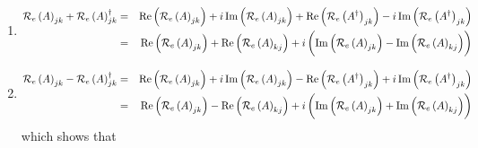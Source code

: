 \begin{remark}
\begin{enumerate}
\begin{enumerate}
\item 
\begin{eqnarray}
{\cal R}_{e}\left( A\right) _{jk}+{\cal R}_{e}\left( A\right) _{jk}^{\dagger
} &=&%
\mathop{\rm Re}%
\left( {\cal R}_{e}\left( A\right) _{jk}\right) +i%
\mathop{\rm Im}%
\left( {\cal R}_{e}\left( A\right) _{jk}\right) +%
\mathop{\rm Re}%
\left( {\cal R}_{e}\left( A^{\dagger }\right) _{jk}\right) -i%
\mathop{\rm Im}%
\left( {\cal R}_{e}\left( A^{\dagger }\right) _{jk}\right) \\
&=&%
\mathop{\rm Re}%
\left( {\cal R}_{e}\left( A\right) _{jk}\right) +%
\mathop{\rm Re}%
\left( {\cal R}_{e}\left( A\right) _{kj}\right) +i\left( \stackrel{}{%
\mathop{\rm Im}%
\left( {\cal R}_{e}\left( A\right) _{jk}\right) -%
\mathop{\rm Im}%
\left( {\cal R}_{e}\left( A\right) _{kj}\right) }\right)
\end{eqnarray}

\item 
\begin{eqnarray}
{\cal R}_{e}\left( A\right) _{jk}-{\cal R}_{e}\left( A\right) _{jk}^{\dagger
} &=&%
\mathop{\rm Re}%
\left( {\cal R}_{e}\left( A\right) _{jk}\right) +i%
\mathop{\rm Im}%
\left( {\cal R}_{e}\left( A\right) _{jk}\right) -%
\mathop{\rm Re}%
\left( {\cal R}_{e}\left( A^{\dagger }\right) _{jk}\right) +i%
\mathop{\rm Im}%
\left( {\cal R}_{e}\left( A^{\dagger }\right) _{jk}\right) \\
&=&%
\mathop{\rm Re}%
\left( {\cal R}_{e}\left( A\right) _{jk}\right) -%
\mathop{\rm Re}%
\left( {\cal R}_{e}\left( A\right) _{kj}\right) +i\left( \stackrel{}{%
\mathop{\rm Im}%
\left( {\cal R}_{e}\left( A\right) _{jk}\right) +%
\mathop{\rm Im}%
\left( {\cal R}_{e}\left( A\right) _{kj}\right) }\right)
\end{eqnarray}%
which shows that
\end{enumerate}


\end{enumerate}
\end{remark}
